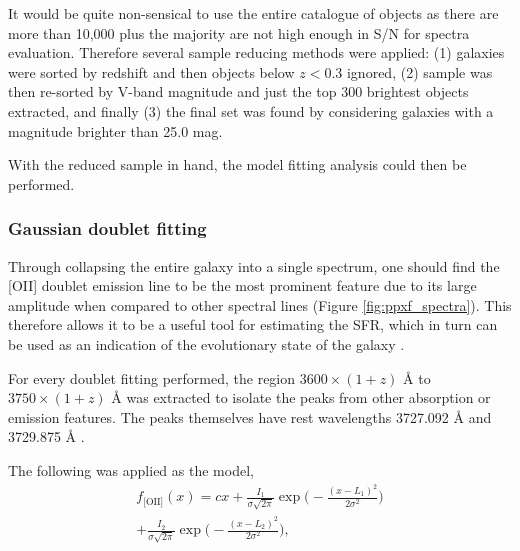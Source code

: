\documentclass[12pt, twocolumn]{revtex4-1}    %
\begin{document}

It would be quite non-sensical to use the entire catalogue of objects as there are more than 10,000 plus the majority are not high enough in S/N for spectra evaluation. Therefore several sample reducing methods were applied: (1) galaxies were sorted by redshift and then objects below $z<0.3$ ignored, (2) sample was then re-sorted by V-band magnitude and just the top 300 brightest objects extracted, and finally (3) the final set was found by considering galaxies with a magnitude brighter than 25.0 mag. 

With the reduced sample in hand, the model fitting analysis could then be performed.





\subsubsection*{Gaussian doublet fitting}

Through collapsing the entire galaxy into a single spectrum, one should find the [OII] doublet emission line to be the most prominent feature due to its large amplitude when compared to other spectral lines (Figure \ref{fig:ppxf_spectra}). This therefore allows it to be a useful tool for estimating the SFR, which in turn can be used as an indication of the evolutionary state of the galaxy \citep{maddox_oxygen}.

For every doublet fitting performed, the region $3600\times(1+z)$ {\AA} to $3750\times(1+z)$ {\AA} was extracted to isolate the peaks from other absorption or emission features. The peaks themselves have rest wavelengths 3727.092 {\AA} and 3729.875 {\AA} \citep{sdss_lines}. 

The following was applied as the model,
\begin{multline}
f_{\text{[OII]}}(x) = cx + \frac{I_1}{\sigma \sqrt{2\pi}} \exp{\Bigg(-\frac{(x-L_1)^2}{2\sigma^2}\Bigg)} \\
+ \frac{I_2}{\sigma \sqrt{2\pi}} \exp{\Bigg(-\frac{(x-L_2)^2}{2\sigma^2}\Bigg)},
\label{eqn:doublet}
\end{multline} 
\end{document}
